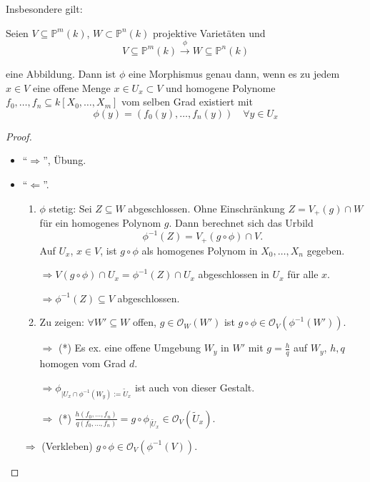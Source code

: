 Insbesondere gilt:
\begin{prop}[orig. 56]
  \label{prop:charakterisierung-morphismen-proj-varietaeten}
  Seien $V\subseteq\mathbb{P}^{m}(k)$, $W\subset\mathbb{P}^{n}(k)$
  projektive Varietäten und
  \[
    V\subseteq\mathbb{P}^{m}(k)\xrightarrow{\phi}W\subseteq\mathbb{P}^{n}(k)
  \]

  eine Abbildung. Dann ist $\phi$ eine Morphismus genau dann, wenn
  es zu jedem $x\in V$ eine offene Menge $x\in U_{x}\subset V$ und
  homogene Polynome $f_{0},\ldots,f_{n}\subseteq k[X_{0},\ldots,X_{m}]$
  vom selben Grad existiert mit
  \[
    \phi(y)=(f_{0}(y),\ldots,f_{n}(y))\quad\forall y\in U_{x}
  \]
\end{prop}
\begin{proof}
  \mbox{}
  \begin{itemize}
  \item ``$\Rightarrow$'', Übung.
  \item ``$\Leftarrow$''.
    \begin{enumerate}
    \item $\phi$ stetig: Sei $Z\subseteq W$ abgeschlossen. Ohne Einschränkung
      $Z=V_{+}(g)\cap W$ für ein homogenes Polynom $g$. Dann berechnet
      sich das Urbild
      \[
        \phi^{-1}(Z)=V_{+}(g\circ\phi)\cap V.
      \]
      Auf $U_{x}$, $x\in V$, ist $g\circ\phi$ als homogenes Polynom in
      $X_{0},\ldots,X_{n}$ gegeben. 

      $\Rightarrow V(g\circ\phi)\cap U_{x}=\phi^{-1}(Z)\cap U_{x}$ abgeschlossen
      in $U_{x}$ für alle $x$.

      $\Rightarrow\phi^{-1}(Z)\subseteq V$ abgeschlossen.
    \item Zu zeigen: $\forall W'\subseteq W$ offen, $g\in\mathcal{O}_{W}(W')$
      ist $g\circ\phi\in\mathcal{O}_{V}(\phi^{-1}(W'))$.

      $\Rightarrow$ ({*}) Es ex. eine offene Umgebung $W_{y}$ in $W'$
      mit $g=\frac{h}{q}$ auf $W_{y}$, $h,q$ homogen vom Grad $d$.

      $\Rightarrow\phi_{|U_{x}\cap\phi^{-1}(W_{y}):=\tilde{U}_{x}}$ ist
      auch von dieser Gestalt.

      $\Rightarrow$ ({*}) $\frac{h(f_{0},\ldots,f_{n})}{q(f_{0},\ldots,f_{n})}=g\circ\phi_{|\tilde{U}_{x}}\in\mathcal{O}_{V}(\tilde{U}_{x})$.
    \end{enumerate}
    $\Rightarrow$ (Verkleben) $g\circ\phi\in\mathcal{O}_{V}(\phi^{-1}(V))$.
  \end{itemize}
\end{proof}

